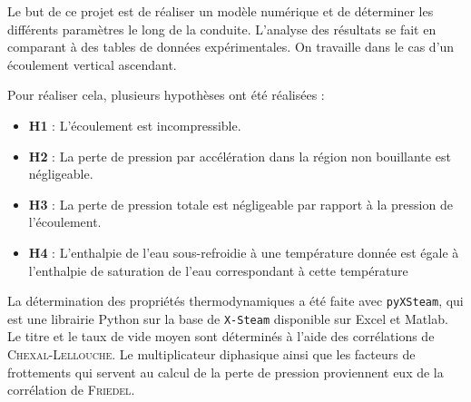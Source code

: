 Le but de ce projet est de réaliser un modèle numérique et de déterminer les différents paramètres le long de la conduite. L'analyse des résultats se fait en comparant à des tables de données expérimentales. On travaille dans le cas d'un écoulement vertical ascendant.\\ \par
Pour réaliser cela, plusieurs hypothèses ont été réalisées :
\begin{itemize}
    \item \textbf{H1} : L'écoulement est incompressible.
    \item \textbf{H2} : La perte de pression par accélération dans la région non bouillante est négligeable.
    \item \textbf{H3} : La perte de pression totale est négligeable par rapport à la pression de l'écoulement.
    \item \textbf{H4} : L'enthalpie de l'eau sous-refroidie à une température donnée est égale à l'enthalpie de saturation de l'eau correspondant à cette température
\end{itemize}
\vspace{12pt}
\par
La détermination des propriétés thermodynamiques a été faite avec \texttt{pyXSteam}, qui est une librairie Python sur la base de \texttt{X-Steam} disponible sur Excel et Matlab.\\
Le titre et le taux de vide moyen sont déterminés à l'aide des corrélations de \textsc{Chexal-Lellouche}. Le multiplicateur diphasique ainsi que les facteurs de frottements qui servent au calcul de la perte de pression proviennent eux de la corrélation de \textsc{Friedel}.\\ \par





